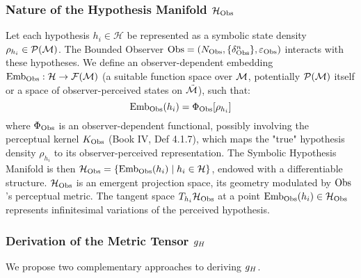 \subsubsection{Nature of the Hypothesis Manifold \(\mathcal{H}_{\mathrm{Obs}}\)}
\label{subsec:bk8_nature_of_the_hypothesis_manifold}
Let each hypothesis \(h_i \in \mathcal{H}\) be represented as a symbolic state density \(\rho_{h_i} \in \mathcal{P}(\mathcal{M})\). The Bounded Observer \(\mathrm{Obs} = (N_{\mathrm{Obs}}, \{\delta^n_{\mathrm{Obs}}\}, \varepsilon_{\mathrm{Obs}})\) interacts with these hypotheses. We define an observer-dependent embedding \(\text{Emb}_{\mathrm{Obs}}: \mathcal{H} \to \mathcal{F}(\mathcal{M})\) (a suitable function space over \(\mathcal{M}\), potentially \(\mathcal{P}(\mathcal{M})\) itself or a space of observer-perceived states on \(\tilde{\mathcal{M}}\)), such that:
\begin{equation}
\text{Emb}_{\mathrm{Obs}}(h_i) = \Phi_{\mathrm{Obs}}[\rho_{h_i}]
\end{equation}
where \(\Phi_{\mathrm{Obs}}\) is an observer-dependent functional, possibly involving the perceptual kernel \(K_{\mathrm{Obs}}\) (Book IV, Def 4.1.7), which maps the "true" hypothesis density \(\rho_{h_i}\) to its observer-perceived representation. The Symbolic Hypothesis Manifold is then \(\mathcal{H}_{\mathrm{Obs}} = \{\text{Emb}_{\mathrm{Obs}}(h_i) \mid h_i \in \mathcal{H}\}\), endowed with a differentiable structure. \(\mathcal{H}_{\mathrm{Obs}}\) is an emergent projection space, its geometry modulated by \(\mathrm{Obs}\)'s perceptual metric.
The tangent space \(T_{h_i}\mathcal{H}_{\mathrm{Obs}}\) at a point \(\text{Emb}_{\mathrm{Obs}}(h_i) \in \mathcal{H}_{\mathrm{Obs}}\) represents infinitesimal variations of the perceived hypothesis.
\subsubsection{Derivation of the Metric Tensor \(g_H\)}
\label{subsec:bk8_derivation_of_the_metric_tensor}
We propose two complementary approaches to deriving \(g_H\).
